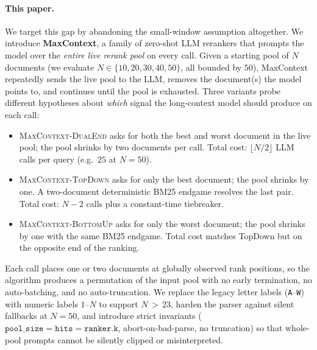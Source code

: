 \paragraph{This paper.} We target this gap by abandoning the small-window
assumption altogether. We introduce \textbf{MaxContext}, a family of zero-shot
LLM rerankers that prompts the model over the \emph{entire live rerank pool}
on every call. Given a starting pool of $N$ documents (we evaluate
$N \in \{10, 20, 30, 40, 50\}$, all bounded by $50$), MaxContext repeatedly
sends the live pool to the LLM, removes the document(s) the model points to,
and continues until the pool is exhausted. Three variants probe different
hypotheses about \emph{which} signal the long-context model should produce on
each call:
\begin{itemize}
\item \textsc{MaxContext-DualEnd} asks for both the best and worst document
  in the live pool; the pool shrinks by two documents per call. Total cost:
  $\lfloor N/2 \rfloor$ LLM calls per query (e.g.\ $25$ at $N{=}50$).
\item \textsc{MaxContext-TopDown} asks for only the best document; the pool
  shrinks by one. A two-document deterministic BM25 endgame resolves the last
  pair. Total cost: $N{-}2$ calls plus a constant-time tiebreaker.
\item \textsc{MaxContext-BottomUp} asks for only the worst document; the pool
  shrinks by one with the same BM25 endgame. Total cost matches TopDown but
  on the opposite end of the ranking.
\end{itemize}
Each call places one or two documents at globally observed rank positions, so
the algorithm produces a permutation of the input pool with no early
termination, no auto-batching, and no auto-truncation. We replace the legacy
letter labels (\texttt{A}--\texttt{W}) with numeric labels $1$--$N$ to support
$N{\,>\,}23$, harden the parser against silent fallbacks at $N{=}50$, and
introduce strict invariants ($\texttt{pool\_size} = \texttt{hits} =
\texttt{ranker.k}$, abort-on-bad-parse, no truncation) so that whole-pool
prompts cannot be silently clipped or misinterpreted.

